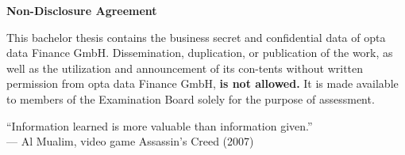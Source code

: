 \thispagestyle{empty} %

\begin{center}
    \Large\textbf{Non-Disclosure Agreement}
\end{center}
\noindent This bachelor thesis contains the business secret and confidential data  of opta data Finance GmbH. Dissemination, duplication, or publication of the work, as well as the utilization and announcement of its con-tents without written permission from opta data Finance GmbH, \textbf{is not allowed.} It is made available to members of the Examination Board solely for the purpose of assessment.\vspace{4cm}

                   \begin{center}
              \color{teal}
                        \large{“Information learned is more valuable than information given.”}\\
                      \color{black} 
                                                 {— Al Mualim, video game Assassin’s Creed (2007)}  
                   \end{center}